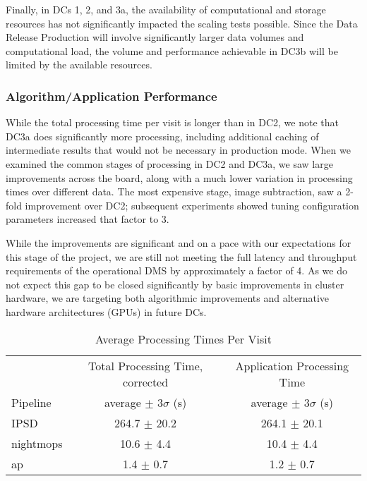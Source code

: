 Finally, in DCs 1, 2, and 3a, the availability of computational and storage resources has not
significantly impacted the scaling tests possible.  Since the Data Release Production will 
involve significantly larger data volumes and computational load, the volume
and performance achievable in DC3b will be limited by the available resources.

\subsubsection*{Algorithm/Application Performance}

While the total processing time per
visit is longer than in DC2, we note that DC3a does significantly more processing,
including additional caching of intermediate results that would not be
necessary in production mode.  When we examined the common stages of
processing in DC2 and DC3a, we saw large improvements across the
board, along with a much lower variation in processing times over
different data.  The most expensive stage, image subtraction, saw a
2-fold improvement over DC2; subsequent experiments showed tuning
configuration parameters increased that factor to 3.

While the improvements are significant and on a pace 
with our expectations for this stage of the project, 
we are still not meeting the full latency and throughput
requirements of the operational DMS by approximately a factor of 4.  As we do not expect 
this gap to be closed significantly by basic improvements in cluster hardware, 
we are targeting both algorithmic
improvements and alternative hardware architectures (GPUs) in future DCs.

\begin{table}[ht]
\begin{center}
\caption{Average Processing Times Per Visit
\label{ex:tbl:visitstats}}
\vspace{\baselineskip}
\begin{tabular}{ l | c | c }
\hline\hline
          & Total Processing Time, corrected
          & Application Processing Time \\ 
Pipeline  & average $\pm$  $3\sigma$ (s) & average $\pm$ $3\sigma$ (s) \\ \hline
IPSD      & 264.7 $\pm$ 20.2 & 264.1 $\pm$ 20.1  \\ 
nightmops & 10.6  $\pm$  4.4 & 10.4 $\pm$  4.4  \\ 
ap        & 1.4   $\pm$  0.7 & 1.2 $\pm$  0.7  \\ \hline
\hline
\end{tabular}

\end{center}
\end{table}

